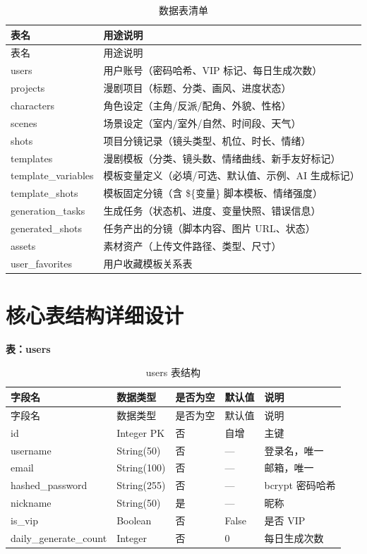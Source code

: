 \documentclass[12pt]{ctexrep}
\begin{document}
\begin{longtable}{p{4.2cm}p{10.8cm}}
\caption{数据表清单}\label{tab:tables}\\
\toprule
表名 & 用途说明\\
\midrule
\endfirsthead
\toprule
表名 & 用途说明\\
\midrule
\endhead
users & 用户账号（密码哈希、VIP 标记、每日生成次数）\\
projects & 漫剧项目（标题、分类、画风、进度状态）\\
characters & 角色设定（主角/反派/配角、外貌、性格）\\
scenes & 场景设定（室内/室外/自然、时间段、天气）\\
shots & 项目分镜记录（镜头类型、机位、时长、情绪）\\
templates & 漫剧模板（分类、镜头数、情绪曲线、新手友好标记）\\
template\_variables & 模板变量定义（必填/可选、默认值、示例、AI 生成标记）\\
template\_shots & 模板固定分镜（含 \$\{变量\} 脚本模板、情绪强度）\\
generation\_tasks & 生成任务（状态机、进度、变量快照、错误信息）\\
generated\_shots & 任务产出的分镜（脚本内容、图片 URL、状态）\\
assets & 素材资产（上传文件路径、类型、尺寸）\\
user\_favorites & 用户收藏模板关系表\\
\bottomrule
\end{longtable}

\section{核心表结构详细设计}

\textbf{表：users}

\begin{longtable}{p{3.6cm}p{3cm}p{1.6cm}p{1.8cm}p{5cm}}
\caption{users 表结构}\label{tab:users}\\
\toprule
字段名 & 数据类型 & 是否为空 & 默认值 & 说明\\
\midrule
\endfirsthead
\toprule
字段名 & 数据类型 & 是否为空 & 默认值 & 说明\\
\midrule
\endhead
id & Integer PK & 否 & 自增 & 主键\\
username & String(50) & 否 & — & 登录名，唯一\\
email & String(100) & 否 & — & 邮箱，唯一\\
hashed\_password & String(255) & 否 & — & bcrypt 密码哈希\\
nickname & String(50) & 是 & — & 昵称\\
is\_vip & Boolean & 否 & False & 是否 VIP\\
daily\_generate\_count & Integer & 否 & 0 & 每日生成次数\\
\bottomrule
\end{longtable}
\end{document}

